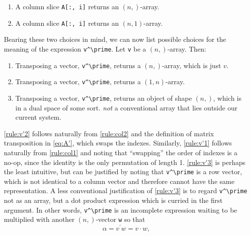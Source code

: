 \begin{enumerate}[label=\bfseries{}C\arabic*]
\item A column slice \lstinline|A[:, i]| returns an $(n,)$-array.\label{rule:col1}
\item A column slice \lstinline|A[:, i]| returns an $(n,1)$-array.\label{rule:col2}
\end{enumerate}

Bearing these two choices in mind, we can now list possible choices for the
meaning of the expression \lstinline|v^\prime|. Let \lstinline|v| be a $(n,)$-array. Then:

\begin{enumerate}[label=\bfseries{}T\arabic*]
\item Transposing a vector, \lstinline|v^\prime|, returns a $(n,)$-array, which is just
      $v$.\label{rule:v'1}
\item Transposing a vector, \lstinline|v^\prime|, returns a $(1,n)$-array.\label{rule:v'2}
\item Transposing a vector, \lstinline|v^\prime|, returns an object of shape $(n,)$,
      which is in a dual space of some sort. \textit{not} a conventional array
      that lies outside our current system.\label{rule:v'3}
\end{enumerate}
%
%
\ref{rule:v'2} follows naturally from \ref{rule:col2} and the definition of
matrix transposition in \eqref{eq:A'}, which swaps the indexes. Similarly,
\ref{rule:v'1} follows naturally from \ref{rule:col1} and noting that
``swapping'' the order of indexes is a no-op, since the identity is the only
permutation of length 1. \ref{rule:v'3} is perhaps the least intuitive, but
can be justified by noting that \lstinline|v^\prime| is a row vector, which is not
identical to a column vector and therefore cannot have the same representation.
A less conventional justification of \ref{rule:v'3} is to regard \lstinline|v^\prime|
not as an array, but a dot product expression which is curried in the first
argument. In other words, \lstinline|v^\prime| is an incomplete expression waiting to
be multiplied with another $(n,)$-vector \lstinline|w| so that
%
\begin{equation}
	\alpha = v^\prime w = v \cdot w,\label{eq:w'v}
\end{equation}
%
%


